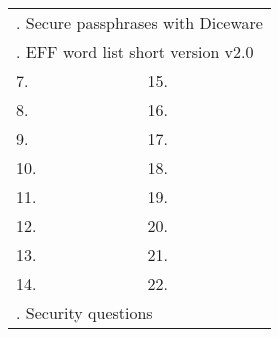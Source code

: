 \newpage

\changepage{}{.3in}{-.15in}{-.15in}{}{}{}{}{}

\newcommand{\myrule}{
	\hdashrule{1.35in}{0.5pt}{1.25pt}
}
\newcommand{\myrulespace}{
	\vspace{.24in}
}

\Large
\begin{center}
		
\textbf{}

\setlength{\tabcolsep}{1pt}
\begin{tabular}{l l l l }
	\multicolumn{4}{l}{\pageref{ch:diceware}. Secure passphrases with Diceware} \vspace{.15in} \\
	\multicolumn{4}{l}{\pageref{ch:wordlist}. EFF word list short version v2.0} \vspace{.15in} \\
	7. & \myrule & 15. & \myrule \myrulespace \\
	8. & \myrule & 16. & \myrule \myrulespace \\
	9. & \myrule & 17. & \myrule \myrulespace \\
	10. & \myrule & 18. & \myrule \myrulespace \\
	11. & \myrule & 19. & \myrule \myrulespace \\
	12. & \myrule & 20. & \myrule \myrulespace \\
	13. & \myrule & 21. & \myrule \myrulespace \\
	14. & \myrule & 22. & \myrule \vspace{.15in} \\
	\multicolumn{4}{l}{\pageref{ch:qna}. Security questions} \\
\end{tabular}

\end{center}

\newpage
\small
\changepage{}{-.3in}{.15in}{.15in}{}{}{}{}{}
